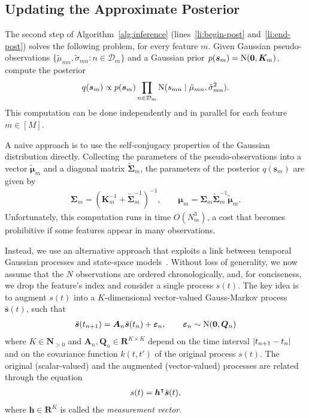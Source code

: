 \subsection{Updating the Approximate Posterior}
\label{kks:sec:inf-posterior}

The second step of Algorithm~\ref{alg:inference} (lines~\ref{li:begin-post} and~\ref{li:end-post}) solves the following problem, for every feature $m$.
Given Gaussian pseudo-observations $\{ \tilde{\mu}_{mn}, \tilde{\sigma}_{mn} : n \in \mathcal{D}_m \}$ and a Gaussian prior $p(\bm{s}_m) = \mathrm{N}( \bm{0}, \bm{K}_m )$, compute the posterior
\begin{align*}
	q(\bm{s}_m) \propto p(\bm{s}_m) \prod_{n \in \mathcal{D}_m} \mathrm{N}( s_{mn} \mid \tilde{\mu}_{mn}, \tilde{\sigma}^2_{mn} ).
\end{align*}
This computation can be done independently and in parallel for each feature $m \in [M]$.

A naive approach is to use the self-conjugacy properties of the Gaussian distribution directly.
Collecting the parameters of the pseudo-observations into a vector $\tilde{\bm{\mu}}_m$ and a diagonal matrix $\tilde{\bm{\Sigma}}_m$, the parameters of the posterior $q(\bm{s}_m)$ are given by
\begin{align}
	\label{kks:eq:batch}
	\bm{\Sigma}_m = (\bm{K}_m^{-1} + \tilde{\bm{\Sigma}}_m^{-1})^{-1}, \qquad
	\bm{\mu}_m    = \bm{\Sigma}_m \tilde{\bm{\Sigma}}_m^{-1} \tilde{\bm{\mu}}_m.
\end{align}
Unfortunately, this computation runs in time $O(N_m^3)$, a cost that becomes prohibitive if some features appear in many observations.

Instead, we use an alternative approach that exploits a link between temporal Gaussian processes and state-space models~\citep{hartikainen2010kalman, reece2010introduction}.
Without loss of generality, we now assume that the $N$ observations are ordered chronologically, and, for conciseness, we drop the feature's index and consider a single process $s(t)$.
The key idea is to augment $s(t)$ into a $K$-dimensional vector-valued Gauss-Markov process $\bar{\bm{s}}(t)$, such that
\begin{align*}
	\bar{\bm{s}}(t_{n+1}) = \bm{A}_n \bar{\bm{s}}(t_n) + \bm{\varepsilon}_n,
	\qquad \bm{\varepsilon}_n \sim \mathrm{N}( \bm{0}, \bm{Q}_n )
\end{align*}
where $K \in \mathbf{N}_{>0}$ and $\bm{A}_n, \bm{Q}_n \in \mathbf{R}^{K \times K}$ depend on the time interval $\lvert t_{n+1} - t_n\rvert$ and on the covariance function $k(t, t')$ of the original process $s(t)$.
The original (scalar-valued) and the augmented (vector-valued) processes are related through the equation
\begin{align*}
	s(t) = \bm{h}^\intercal \bar{\bm{s}}(t),
\end{align*}
where $\bm{h} \in \mathbf{R}^K$ is called the \emph{measurement vector}.

